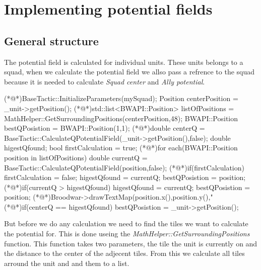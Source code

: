 \section{Implementing potential fields}
	
	\subsection{General structure}
		
	
	The potential field is calculated for individual units. These units belongs to a squad, when we calculate the potential field we allso pass a refrence to the squad because it is needed to calculate \textit{Squad center} and \textit{Ally potential}.

\begin{Sourcecode}[caption=Main loop]	
(*@\lnote@*)BaseTactic::InitializeParameters(mySquad);
Position centerPosition = _unit->getPosition();
(*@\lnote@*)std::list<BWAPI::Position> listOfPositions = MathHelper::GetSurroundingPositions(centerPosition,48);
BWAPI::Position bestQPosistion = BWAPI::Position(1,1);
(*@\lnote@*)double centerQ = BaseTactic::CalculateQPotentialField(_unit->getPosition(),false);
double higestQfound; 
bool firstCalculation = true;
(*@\lnote@*)for each(BWAPI::Position position in listOfPositions)
{
	double currentQ = BaseTactic::CalculateQPotentialField(position,false);
	(*@\lnote@*)if(firstCalculation)
	{
		firstCalculation = false;
		higestQfound = currentQ;
		bestQPosistion = position;
	} 
	(*@\lnote@*)if(currentQ > higestQfound)
	{
		higestQfound = currentQ;
		bestQPosistion = position;
	}
	(*@\lnote@*)Broodwar->drawTextMap(position.x(),position.y(),"%
}
(*@\lnote@*)if(centerQ == higestQfound)
{
	bestQPosistion = _unit->getPosition();
}
\end{Sourcecode}	
	But before we do any calculation we need to find the tiles we want to calculate the potential for. This is done useing the \textit{MathHelper::GetSurroundingPositions} function. This function takes two parameters, the tile the unit is currently on and the distance to the center of the adjecent tiles. From this we calculate all tiles arround the unit and and them to a list.

	
	

